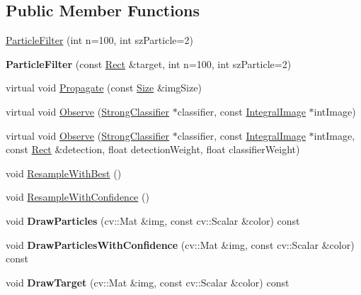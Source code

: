 \subsection*{Public Member Functions}
\begin{DoxyCompactItemize}
\item 
\hyperlink{classParticleFilter_ad05d7aeddc103fc32b6de3a751c37471}{Particle\+Filter} (int n=100, int sz\+Particle=2)
\item 
\hypertarget{classParticleFilter_a8f8647624fb770f966eeacb5e2b94310}{}{\bfseries Particle\+Filter} (const \hyperlink{classRect}{Rect} \&target, int n=100, int sz\+Particle=2)\label{classParticleFilter_a8f8647624fb770f966eeacb5e2b94310}

\item 
virtual void \hyperlink{classParticleFilter_a166db9f33feabf14126df2de541a593d}{Propagate} (const \hyperlink{classSize}{Size} \&img\+Size)
\item 
virtual void \hyperlink{classParticleFilter_ac564ef678bef8d6ff2fc70258cc7e822}{Observe} (\hyperlink{classStrongClassifier}{Strong\+Classifier} $\ast$classifier, const \hyperlink{classIntegralImage}{Integral\+Image} $\ast$int\+Image)
\item 
virtual void \hyperlink{classParticleFilter_a7dc0bf5137e9e7d8f59961618dbd9215}{Observe} (\hyperlink{classStrongClassifier}{Strong\+Classifier} $\ast$classifier, const \hyperlink{classIntegralImage}{Integral\+Image} $\ast$int\+Image, const \hyperlink{classRect}{Rect} \&detection, float detection\+Weight, float classifier\+Weight)
\item 
void \hyperlink{classParticleFilter_a76b01cd9d9d0fa181b89ffe3dcf5fbab}{Resample\+With\+Best} ()
\item 
void \hyperlink{classParticleFilter_ab191492fa8c67ecb0546e69d50fa2481}{Resample\+With\+Confidence} ()
\item 
\hypertarget{classParticleFilter_a666ab9bee3ed479c5e9387f8d5908e48}{}void {\bfseries Draw\+Particles} (cv\+::\+Mat \&img, const cv\+::\+Scalar \&color) const \label{classParticleFilter_a666ab9bee3ed479c5e9387f8d5908e48}

\item 
\hypertarget{classParticleFilter_a10b8f53b1f9245417ecab6f3dcb483e7}{}void {\bfseries Draw\+Particles\+With\+Confidence} (cv\+::\+Mat \&img, const cv\+::\+Scalar \&color) const \label{classParticleFilter_a10b8f53b1f9245417ecab6f3dcb483e7}

\item 
\hypertarget{classParticleFilter_ace5259baa39baccc26212d9ed116cf7c}{}void {\bfseries Draw\+Target} (cv\+::\+Mat \&img, const cv\+::\+Scalar \&color) const \label{classParticleFilter_ace5259baa39baccc26212d9ed116cf7c}


\end{DoxyCompactItemize}
